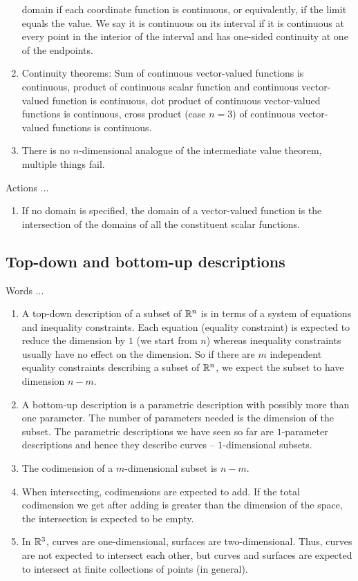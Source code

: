 \documentclass[10pt]{amsart}
\begin{document}
\begin{enumerate}
  domain if each coordinate function is continuous, or equivalently,
  if the limit equals the value. We say it is continuous on its
  interval if it is continuous at every point in the interior of the
  interval and has one-sided continuity at one of the endpoints.
\item Continuity theorems: Sum of continuous vector-valued functions
  is continuous, product of continuous scalar function and continuous
  vector-valued function is continuous, dot product of continuous
  vector-valued functions is continuous, cross product (case $n = 3$)
  of continuous vector-valued functions is continuous.
\item There is no $n$-dimensional analogue of the intermediate value
  theorem, multiple things fail.
\end{enumerate}

Actions ...

\begin{enumerate}
\item If no domain is specified, the domain of a vector-valued
  function is the intersection of the domains of all the constituent
  scalar functions.
\end{enumerate}

\subsection{Top-down and bottom-up descriptions}

Words ...

\begin{enumerate}
\item A top-down description of a subset of $\mathbb{R}^n$ is in terms of a
  system of equations and inequality constraints. Each equation
  (equality constraint) is expected to reduce the dimension by $1$ (we
  start from $n$) whereas inequality constraints usually have no
  effect on the dimension. So if there are $m$ independent equality
  constraints describing a subset of $\mathbb{R}^n$, we expect the subset to
  have dimension $n - m$.
\item A bottom-up description is a parametric description with
  possibly more than one parameter. The number of parameters needed is
  the dimension of the subset. The parametric descriptions we have
  seen so far are $1$-parameter descriptions and hence they describe
  curves -- $1$-dimensional subsets.
\item The codimension of a $m$-dimensional subset is $n - m$.
\item When intersecting, codimensions are expected to add. If the
  total codimension we get after adding is greater than the dimension of
  the space, the intersection is expected to be empty.
\item In $\mathbb{R}^3$, curves are one-dimensional, surfaces are
  two-dimensional. Thus, curves are not expected to intersect each
  other, but curves and surfaces are expected to intersect at finite
  collections of points (in general).
\end{enumerate}
\end{document}
